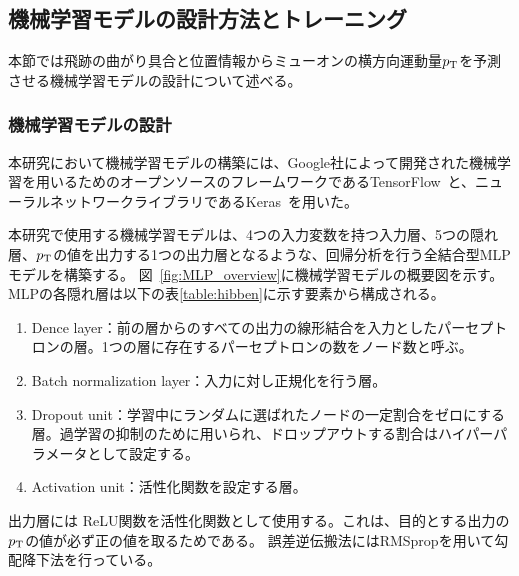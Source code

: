 

\subsection{機械学習モデルの設計方法とトレーニング}
本節では飛跡の曲がり具合と位置情報からミューオンの横方向運動量$p_{\rm{T}}$を予測させる機械学習モデルの設計について述べる。

\subsubsection{機械学習モデルの設計}
本研究において機械学習モデルの構築には、Google社によって開発された機械学習を用いるためのオープンソースのフレームワークであるTensorFlow~\cite{article:TensorFlow}と、ニューラルネットワークライブラリであるKeras~\cite{article:keras}を用いた。

本研究で使用する機械学習モデルは、4つの入力変数を持つ入力層、5つの隠れ層、$p_{\rm{T}}$の値を出力する1つの出力層となるような、回帰分析を行う全結合型MLPモデルを構築する。
図~\ref{fig:MLP_overview}に機械学習モデルの概要図を示す。
MLPの各隠れ層は以下の表\ref{table:hibben}に示す要素から構成される。
\begin{enumerate}\label{table:hibben}
   \item Dence layer：前の層からのすべての出力の線形結合を入力としたパーセプトロンの層。1つの層に存在するパーセプトロンの数をノード数と呼ぶ。
   \item Batch normalization layer：入力に対し正規化を行う層。
   \item Dropout unit：学習中にランダムに選ばれたノードの一定割合をゼロにする層。過学習の抑制のために用いられ、ドロップアウトする割合はハイパーパラメータとして設定する。
   \item Activation unit：活性化関数を設定する層。
\end{enumerate}
出力層には ReLU関数を活性化関数として使用する。これは、目的とする出力の $p_{\rm{T}}$の値が必ず正の値を取るためである。
誤差逆伝搬法にはRMSpropを用いて勾配降下法を行っている。

